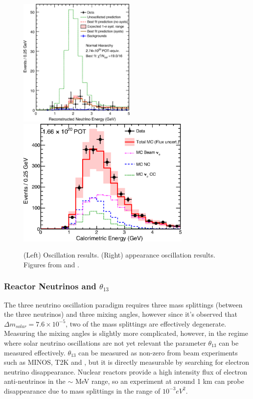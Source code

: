 \begin{figure}[htbp]
  \centering
  \includegraphics[height=2.5in]{intro_figures/nova_numu.png}
  \includegraphics[height=2.5in]{intro_figures/nova_nue.png}
  \caption[\nova Oscillation Results]{(Left) \numu Oscillation results. (Right) \nue appearance oscillation results.  Figures from \cite{PhysRevD.93.051104} and \cite{Adamson:2016tbq}.}
  \label{fig:nova_oscillations}
\end{figure}

\subsubsection{Reactor Neutrinos and $\theta_{13}$}

The three neutrino oscillation paradigm requires three mass splittings (between the three neutrinos) and three mixing angles, however since it's observed that $\Delta m_{solar} = 7.6 \times 10^{-5}$, two of the mass splittings are effectively degenerate.  Measuring the mixing angles is slightly more complicated, however, in the regime where solar neutrino oscillations are not yet relevant the parameter $\theta_{13}$ can be measured effectively.  $\theta_{13}$ can be measured as non-zero from beam experiments such as MINOS, T2K and \nova \cite{PhysRevLett.107.181802, PhysRevLett.116.151806, PhysRevD.88.032002}, but it is directly measurable by searching for electron neutrino disappearance.  Nuclear reactors provide a high intensity flux of electron anti-neutrinos in the $\sim$ MeV range, so an experiment at around 1 km can probe \nuebar disappearance due to mass splittings in the range of $10^{-3} eV^2$.


